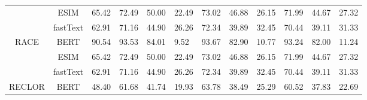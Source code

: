 \begin{table}[th]
\begin{tabular}{c|c|llll|lll|lll}
\multicolumn{1}{c|}{}                        & ESIM                       & \multicolumn{1}{l|}{65.42}    & 72.49                         & 50.00                         & 22.49                         & 73.02                         & 46.88                         & 26.15                         & 71.99                         & 44.67                         & 27.32                        \\
\multicolumn{1}{c|}{}                        & fastText                   & \multicolumn{1}{l|}{62.91}    & 71.16                         & 44.90                         & 26.26                         & 72.34                         & 39.89                         & 32.45                         & 70.44                         & 39.11                         & 31.33                        \\ \hline
\multicolumn{1}{c|}{\multirow{3}{*}{RACE}}   & BERT                       & \multicolumn{1}{l|}{90.54}    & 93.53                         & 84.01                         & 9.52                          & 93.67                         & 82.90                         & 10.77                         & 93.24                         & 82.00                         & 11.24                        \\
\multicolumn{1}{c|}{}                        & ESIM                       & \multicolumn{1}{l|}{65.42}    & 72.49                         & 50.00                         & 22.49                         & 73.02                         & 46.88                         & 26.15                         & 71.99                         & 44.67                         & 27.32                        \\
\multicolumn{1}{c|}{}                        & fastText                   & \multicolumn{1}{l|}{62.91}    & 71.16                         & 44.90                         & 26.26                         & 72.34                         & 39.89                         & 32.45                         & 70.44                         & 39.11                         & 31.33                        \\ \hline
\multicolumn{1}{c|}{\multirow{3}{*}{RECLOR}} & BERT                       & \multicolumn{1}{l|}{48.40}    & 61.68                         & 41.74                         & 19.93                         & 63.78                         & 38.49                         & 25.29                         & 60.52                         & 37.83                         & 22.69                        \\

\end{tabular}
\end{table}
